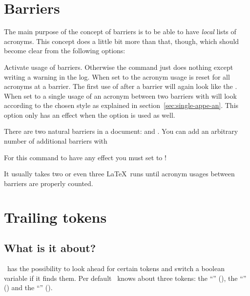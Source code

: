 \documentclass{acro-manual}
\begin{document}
\section{Barriers}\label{sec:barriers}
The main purpose of the concept of barriers is to be able to have \emph{local}
lists of acronyms.  This concept does a little bit more than that, though,
which should become clear from the following options:
\begin{options}
    Activate usage of barriers.  Otherwise the command  just
    does nothing except writing a warning in the log.
    When set to  the acronym usage is reset for all acronyms at a
    barrier.  The first use of  after a barrier will again look like
    the .
    When set to  a single usage of an acronym between two barriers
    with  will look according to the chosen style as explained in
    section~\vref{sec:single-appe-an}.  This option only has an effect when
    the option  is used as well.
\end{options}

There are two natural barriers in a document: \beginenv*{} and
\endenv*{}. You can add an arbitrary number of additional
barriers with
\begin{commands}
    For this command to have any effect you must set
    \code{/} to !
\end{commands}
\begin{bewareofthedog}
  It usually takes two or even three \LaTeX\ runs until acronym usages
  between barriers are properly counted.
\end{bewareofthedog}

\section{Trailing tokens}\label{sec:trailing-tokens}
\subsection{What is it about?}
\acro\ has the possibility to look ahead for certain tokens and switch a
boolean variable if it finds them.  Per default \acro\ knows about three
tokens: the \enquote{} (), the \enquote{}
(\sym{-}) and the \enquote{} ().
\end{document}
